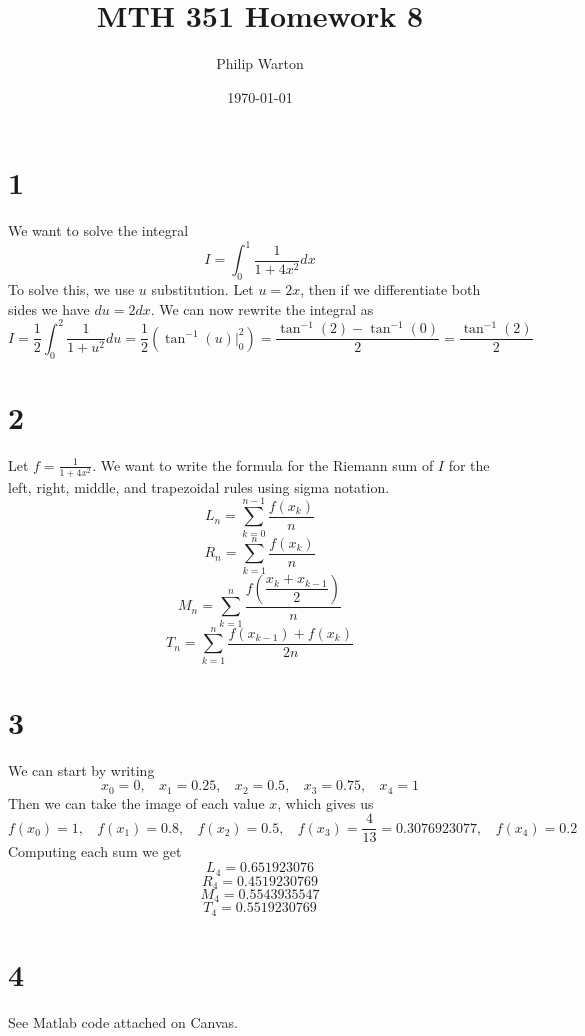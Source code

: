 \documentclass{article}
\begin{document}
\title{MTH 351 Homework 8}
\author{Philip Warton}
\date{\today}
\maketitle
\section*{1}
We want to solve the integral 
\[ I = \int_0^1\frac{1}{1+4x^2}dx\]
To solve this, we use $u$ substitution. Let $u = 2x$, then if we differentiate both sides we have $du = 2dx$. We can now rewrite the integral as
\[ I = \frac{1}{2}\int_0^2\frac{1}{1+u^2}du = \frac{1}{2}\left(\tan^{-1}(u)\bigg|_0^2\right) = \frac{\tan^{-1}(2)-\tan^{-1}(0)}{2}=\frac{\tan^{-1}(2)}{2}\]

\section*{2}
Let $f = \frac{1}{1+4x^2}$. We want to write the formula for the Riemann sum of $I$ for the left, right, middle, and trapezoidal rules using sigma notation.
\[ L_n = \sum_{k=0}^{n-1}\frac{f(x_k)}{n}\]
\[ R_n = \sum_{k=1}^n\frac{f(x_k)}{n}\]
\[ M_n = \sum_{k=1}^n\frac{f\left(\dfrac{x_k + x_{k-1}}{2}\right)}{n}\]
\[ T_n = \sum_{k=1}^n\frac{f(x_{k-1}) + f(x_k)}{2n}\]

\section*{3}
We can start by writing
\[ x_0 = 0, \ \ \ \ x_1 = 0.25, \ \ \ \ x_2 = 0.5,\ \ \ \  x_3 = 0.75,\ \ \ \ x_4 = 1\]
Then we can take the image of each value $x$, which gives us
\[f(x_0)=1, \ \ \ \ f(x_1)=0.8,\ \ \ \ f(x_2)=0.5,\ \ \ \ f(x_3)=\frac{4}{13}=0.3076923077,\ \ \ \ f(x_4)=0.2\]
Computing each sum we get
\[ L_4 = 0.651923076 \]
\[ R_4 = 0.4519230769\]
\[ M_4 = 0.5543935547\]
\[ T_4 =  0.5519230769\]

\section*{4}
See Matlab code attached on Canvas.
\end{document}

